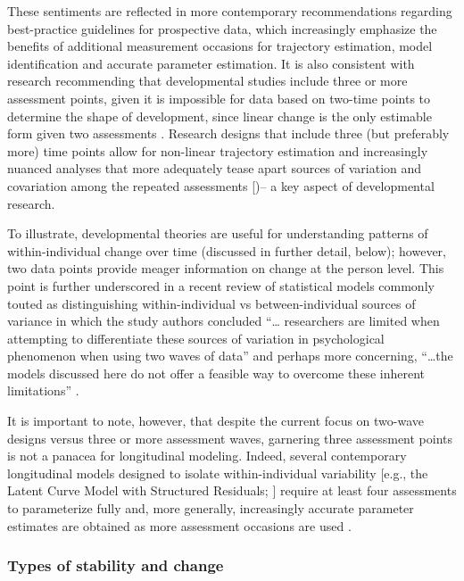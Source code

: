\documentclass[
  number,
  preprint,
  3p,
  twocolumn]{elsarticle}
\begin{document}
These sentiments are reflected in more contemporary recommendations
regarding best-practice guidelines for prospective data, which
increasingly emphasize the benefits of additional measurement occasions
for trajectory estimation, model identification and accurate parameter
estimation. It is also consistent with research recommending that
developmental studies include three or more assessment points, given it
is impossible for data based on two-time points to determine the shape
of development, since linear change is the only estimable form given two
assessments \citep[see][]{duncan2009}. Research designs that include
three (but preferably more) time points allow for non-linear trajectory
estimation and increasingly nuanced analyses that more adequately tease
apart sources of variation and covariation among the repeated
assessments {[}\citep{king2018})-- a key aspect of developmental
research.

To illustrate, developmental theories are useful for understanding
patterns of within-individual change over time (discussed in further
detail, below); however, two data points provide meager information on
change at the person level. This point is further underscored in a
recent review of statistical models commonly touted as distinguishing
within-individual vs between-individual sources of variance in which the
study authors concluded ``\ldots{} researchers are limited when
attempting to differentiate these sources of variation in psychological
phenomenon when using two waves of data'' and perhaps more concerning,
``\ldots the models discussed here do not offer a feasible way to
overcome these inherent limitations'' \citep{littlefield2021}.

It is important to note, however, that despite the current focus on
two-wave designs versus three or more assessment waves, garnering three
assessment points is not a panacea for longitudinal modeling. Indeed,
several contemporary longitudinal models designed to isolate
within-individual variability {[}e.g., the Latent Curve Model with
Structured Residuals; \citep{curran2014}{]} require at least four
assessments to parameterize fully and, more generally, increasingly
accurate parameter estimates are obtained as more assessment occasions
are used \citep{duncan2009}.

\hypertarget{types-of-stability-and-change}{%
\subsubsection{Types of stability and
change}\label{types-of-stability-and-change}}
\end{document}
